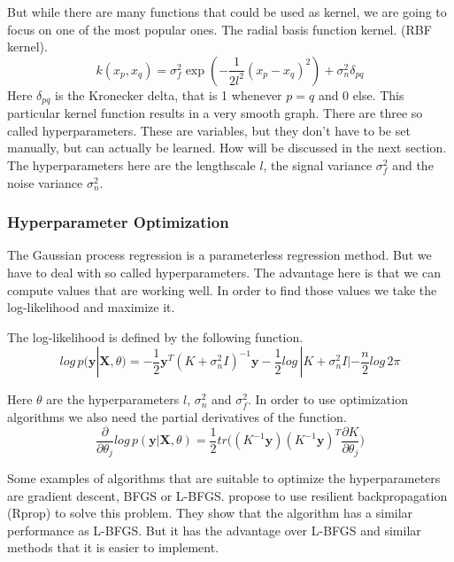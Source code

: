 But while there are many functions that could be used as kernel, we are going to focus on one of the most popular ones. The radial basis function kernel. (RBF kernel).
\begin{equation}\label{eq:rbf}
k(x_p,x_q) = \sigma_f^2\exp(-\dfrac{1}{2l^2}(x_p-x_q)^2)+\sigma_n^2\delta_{pq}
\end{equation} 
Here $\delta_{pq}$ is the Kronecker delta, that is 1 whenever $p=q$ and 0 else. This particular kernel function results in a very smooth graph. There are three so called hyperparameters. These are variables, but they don't have to be set manually, but can actually be learned. How will be discussed in the next section. 
The hyperparameters here are the lengthscale $l$, the signal variance $\sigma_f^2$ and the noise variance $\sigma_n^2$. 

\subsubsection{Hyperparameter Optimization}
The Gaussian process regression is a parameterless regression method. But we have to deal with so called hyperparameters. The advantage here is that we can compute values that are working well. In order to find those values we take the log-likelihood and maximize it. 

The log-likelihood is defined by the following function. \cite[p. 113]{Rasmussen:2005:GPM:1162254}
\begin{equation} \label{eq:ll}
log\,p(\mathbf{y}|\mathbf{X},\theta) = -\dfrac{1}{2}\mathbf{y}^T(K+\sigma^2_nI)^{-1}\mathbf{y}-\dfrac{1}{2}log\,|K+\sigma^2_nI|-\dfrac{n}{2}log\,2\pi
\end{equation}

Here $\theta$ are the hyperparameters $l$, $\sigma_n^2$ and $\sigma_f^2$. In order to use optimization algorithms we also need the partial derivatives of the function. \\\cite[p. 114]{Rasmussen:2005:GPM:1162254}
\begin{equation}\label{eq:lld}
\dfrac{\partial}{\partial\theta_j}log\,p(\mathbf{y}|\mathbf{X},\theta) = \dfrac{1}{2}tr\bigg((K^{-1}\mathbf{y}) (K^{-1}\mathbf{y})^T \dfrac{\partial K}{\partial \theta_j}\bigg)
\end{equation}

Some examples of algorithms that are suitable to optimize the hyperparameters are gradient descent, BFGS or L-BFGS. \cite{blum2013optimization} propose to use resilient backpropagation (Rprop) to solve this problem. They show that the algorithm has a similar performance as L-BFGS. But it has the advantage over L-BFGS and similar methods that it is easier to implement.

